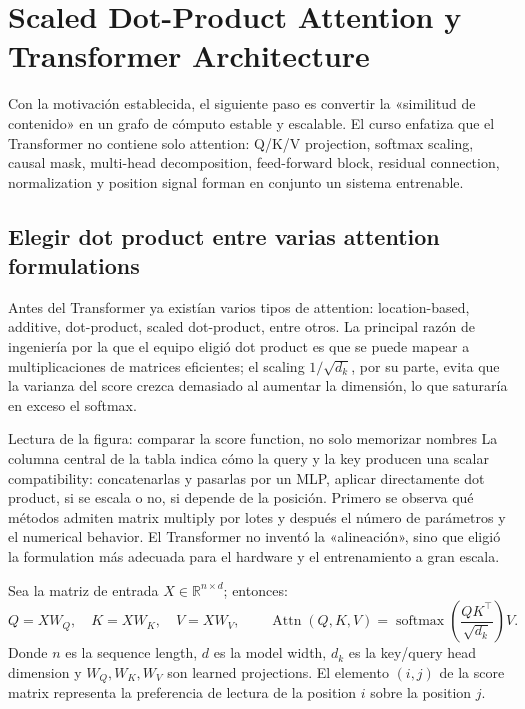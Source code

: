 \section{Scaled Dot-Product Attention y Transformer Architecture}

Con la motivación establecida, el siguiente paso es convertir la «similitud de contenido» en un grafo de cómputo estable y escalable. El curso enfatiza que el Transformer no contiene solo attention: Q/K/V projection, softmax scaling, causal mask, multi-head decomposition, feed-forward block, residual connection, normalization y position signal forman en conjunto un sistema entrenable.

\subsection{Elegir dot product entre varias attention formulations}

Antes del Transformer ya existían varios tipos de attention: location-based, additive, dot-product, scaled dot-product, entre otros. La principal razón de ingeniería por la que el equipo eligió dot product es que se puede mapear a multiplicaciones de matrices eficientes; el scaling $1/\sqrt{d_k}$, por su parte, evita que la varianza del score crezca demasiado al aumentar la dimensión, lo que saturaría en exceso el softmax.


\begin{knowledgebox}{Lectura de la figura: comparar la score function, no solo memorizar nombres}
La columna central de la tabla indica cómo la query y la key producen una scalar compatibility: concatenarlas y pasarlas por un MLP, aplicar directamente dot product, si se escala o no, si depende de la posición. Primero se observa qué métodos admiten matrix multiply por lotes y después el número de parámetros y el numerical behavior. El Transformer no inventó la «alineación», sino que eligió la formulation más adecuada para el hardware y el entrenamiento a gran escala.
\end{knowledgebox}

Sea la matriz de entrada $X\in\mathbb{R}^{n\times d}$; entonces:
\[
Q=XW_Q,\quad K=XW_K,\quad V=XW_V,\qquad
\operatorname{Attn}(Q,K,V)=\operatorname{softmax}\!\left(\frac{QK^\top}{\sqrt{d_k}}\right)V.
\]
Donde $n$ es la sequence length, $d$ es la model width, $d_k$ es la key/query head dimension y $W_Q,W_K,W_V$ son learned projections. El elemento $(i,j)$ de la score matrix representa la preferencia de lectura de la position $i$ sobre la position $j$.

